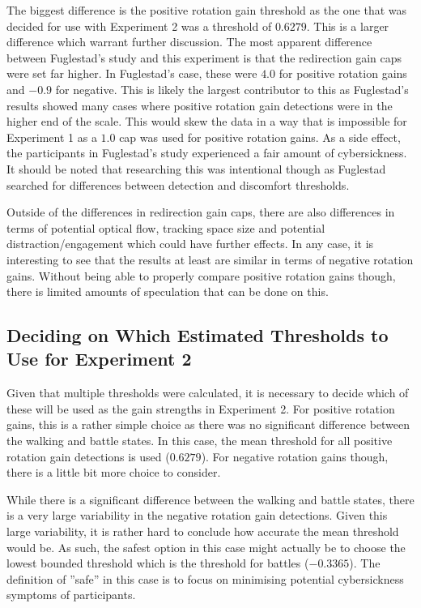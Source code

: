 The biggest difference is the positive rotation gain threshold as the one that was decided for use with Experiment 2 was a threshold of $0.6279$. This is a larger difference which warrant further discussion. The most apparent difference between Fuglestad's study and this experiment is that the redirection gain caps were set far higher. In Fuglestad's case, these were $4.0$ for positive rotation gains and $-0.9$ for negative. This is likely the largest contributor to this as Fuglestad's results showed many cases where positive rotation gain detections were in the higher end of the scale. This would skew the data in a way that is impossible for Experiment 1 as a $1.0$ cap was used for positive rotation gains. As a side effect, the participants in Fuglestad's study experienced a fair amount of cybersickness. It should be noted that researching this was intentional though as Fuglestad searched for differences between detection and discomfort thresholds.

Outside of the differences in redirection gain caps, there are also differences in terms of potential optical flow, tracking space size and potential distraction/engagement which could have further effects. In any case, it is interesting to see that the results at least are similar in terms of negative rotation gains. Without being able to properly compare positive rotation gains though, there is limited amounts of speculation that can be done on this. 

\subsection{Deciding on Which Estimated Thresholds to Use for Experiment 2}
Given that multiple thresholds were calculated, it is necessary to decide which of these will be used as the gain strengths in Experiment 2. For positive rotation gains, this is a rather simple choice as there was no significant difference between the walking and battle states. In this case, the mean threshold for all positive rotation gain detections is used ($0.6279$). For negative rotation gains though, there is a little bit more choice to consider.

While there is a significant difference between the walking and battle states, there is a very large variability in the negative rotation gain detections. Given this large variability, it is rather hard to conclude how accurate the mean threshold would be. As such, the safest option in this case might actually be to choose the lowest bounded threshold which is the threshold for battles ($-0.3365$). The definition of ''safe'' in this case is to focus on minimising potential cybersickness symptoms of participants. 

